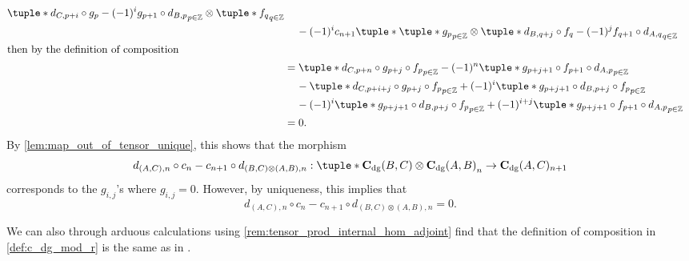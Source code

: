 \begin{remark}
\begin{enumerate}
{\begin{align*}
{                    \tuple*{
                        d_{C, p + i} \circ g_p - (-1)^i g_{p + 1} \circ d_{B, p}
                    }_{p \in \Zb} \otimes \tuple*{ f_q }_{q \in \Zb}
                } \\
                &\hspace{0.4cm} - (-1)^i c_{n + 1} \tuple*{
                    \tuple*{ g_p }_{p \in \Zb} \otimes \tuple*{
                        d_{B, q + j} \circ f_q - (-1)^j f_{q + 1} \circ d_{A, q}
                    }_{q \in \Zb}
                } \\
                \intertext{then by the definition of composition}
                &= \tuple*{
                    d_{C, p + n} \circ g_{p + j} \circ f_p
                }_{p \in \Zb} - (-1)^n \tuple*{
                    g_{p + j + 1} \circ f_{p + 1} \circ d_{A, p}
                }_{p \in \Zb} \\
                &\hspace{0.4cm} - \tuple*{
                    d_{C, p + i + j} \circ g_{p + j} \circ f_p
                }_{p \in \Zb} + (-1)^i \tuple*{
                    g_{p + j + 1} \circ d_{B, p + j} \circ f_p
                }_{p \in \Zb} \\
                &\hspace{0.4cm} - (-1)^i \tuple*{
                    g_{p + j + 1} \circ d_{B, p + j} \circ f_p
                }_{p \in \Zb} + (-1)^{i + j} \tuple*{
                    g_{p + j + 1} \circ f_{p + 1} \circ d_{A, p}
                }_{p \in \Zb} \\
                &= 0.
            \end{align*}
            By \autoref{lem:map_out_of_tensor_unique}, this shows that the morphism
            \[
                d_{(A, C), n} \circ c_n - c_{n + 1} \circ d_{(B, C) \otimes (A, B), n}: \\
                \tuple*{ \C_{\dg}(B, C) \otimes \C_{\dg}(A, B) }_n \to \C_{\dg}(A, C)_{n + 1}
            \]         
            corresponds to the \( g_{i,j} \)'s where \( g_{i, j} = 0 \). However, by uniqueness, this implies that
            \[
                d_{(A, C), n} \circ c_n - c_{n + 1} \circ d_{(B, C) \otimes (A, B), n} = 0.
            \]
        }
    \end{enumerate}
\end{remark}

We can also through arduous calculations using \autoref{rem:tensor_prod_internal_hom_adjoint} find that the definition of composition in \autoref{def:c_dg_mod_r} is the same as in \cite[p. 295]{Borceux_1994}.


